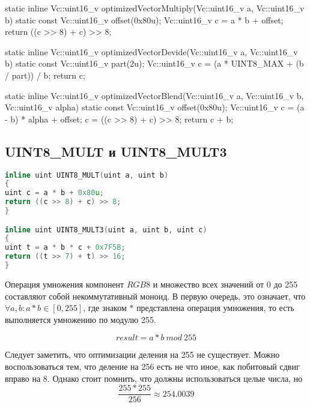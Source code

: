 


static inline Vc::uint16_v optimizedVectorMultiply(Vc::uint16_v a, Vc::uint16_v b)
{
    static const Vc::uint16_v offset(0x80u);
    Vc::uint16_v c = a * b + offset;
    return ((c >> 8) + c) >> 8;
}

static inline Vc::uint16_v optimizedVectorDevide(Vc::uint16_v a, Vc::uint16_v b)
{
    static const Vc::uint16_v part(2u);
    Vc::uint16_v c = (a * UINT8_MAX + (b / part)) / b;
    return c;
}

static inline Vc::uint16_v optimizedVectorBlend(Vc::uint16_v a, Vc::uint16_v b, Vc::uint16_v alpha)
{
    static const Vc::uint16_v offset(0x80u);
    Vc::uint16_v c = (a - b) * alpha + offset;
    c = ((c >> 8) + c) >> 8;
    return c + b;
}
\subsection{UINT8\_MULT и UINT8\_MULT3}
\begin{lstlisting}[language=c++]
inline uint UINT8_MULT(uint a, uint b)
{
uint c = a * b + 0x80u;
return ((c >> 8) + c) >> 8;
}

inline uint UINT8_MULT3(uint a, uint b, uint c)
{
uint t = a * b * c + 0x7F5B;
return ((t >> 7) + t) >> 16;
}
\end{lstlisting}

Операция умножения компонент $RGB8$ и множество всех значений от 0 до 255 составляют собой некоммутативный моноид. В первую очередь, это означает, что $\forall a, b : a * b \in [0, 255]$, где знаком $*$ представлена операция умножения, то есть выполняется умножению по модулю 255. 

\begin{equation}
result = a * b~mod~255
\end{equation}


Следует заметить, что оптимизации деления на 255 не существует. Можно воспользоваться тем, что деление на 256 есть не что иное, как побитовый сдвиг вправо на 8. Однако стоит помнить, что должны использоваться целые числа, но
\begin{equation}
\frac{255*255}{256} \approx 254.0039
\end{equation}

